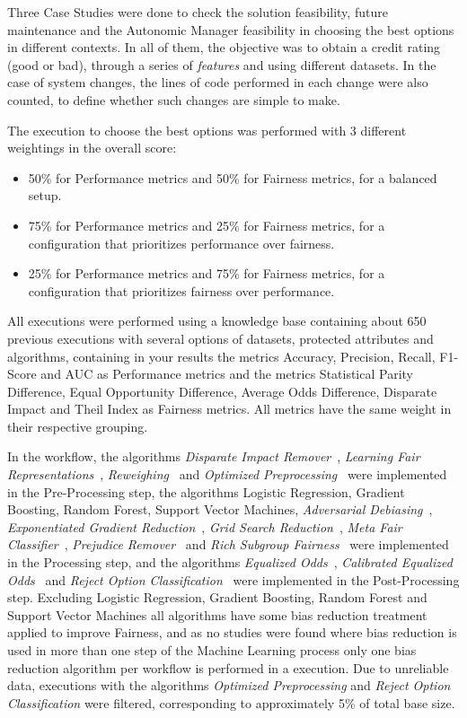 \documentclass[runningheads]{llncs}
\begin{document}
Three Case Studies were done to check the solution feasibility, future maintenance and the Autonomic Manager feasibility in choosing the best options in different contexts. In all of them, the objective was to obtain a credit rating (good or bad), through a series of \textit{features} and using different datasets. In the case of system changes, the lines of code performed in each change were also counted, to define whether such changes are simple to make.

The execution to choose the best options was performed with 3 different weightings in the overall score:

\begin{itemize}
\item 50\% for Performance metrics and 50\% for Fairness metrics, for a balanced setup.
\item 75\% for Performance metrics and 25\% for Fairness metrics, for a configuration that prioritizes performance over fairness.
\item 25\% for Performance metrics and 75\% for Fairness metrics, for a configuration that prioritizes fairness over performance.
\end{itemize}

All executions were performed using a knowledge base containing about 650 previous executions with several options of datasets, protected attributes and algorithms, containing in your results the metrics Accuracy, Precision, Recall, F1-Score and AUC as Performance metrics and the metrics Statistical Parity Difference, Equal Opportunity Difference, Average Odds Difference, Disparate Impact and Theil Index as Fairness metrics. All metrics have the same weight in their respective grouping.

In the workflow, the algorithms \textit{Disparate Impact Remover}~\citep{Feldman_2015}, \textit{Learning Fair Representations}~\citep{Zemel_2013}, \textit{Reweighing}~\citep{Kamiran_2011} and \textit{Optimized Preprocessing}~\citep{Calmon_2017} were implemented in the Pre-Processing step, the algorithms Logistic Regression, Gradient Boosting, Random Forest, Support Vector Machines, \textit{Adversarial Debiasing}~\citep{Zhang_2018}, \textit{Exponentiated Gradient Reduction}~\citep{Agarwal_2018}, \textit{Grid Search Reduction}~\citep{Agarwal_2019}, \textit{Meta Fair Classifier}~\citep{Celis_2019}, \textit{Prejudice Remover}~\citep{Kamishima_2012} and \textit{Rich Subgroup Fairness}~\citep{Kearns_2018} were implemented in the Processing step, and the algorithms \textit{Equalized Odds}~\citep{Hardt_2016}, \textit{Calibrated Equalized Odds}~\citep{Pleiss_2017} and \textit{Reject Option Classification}~\citep{Kamiran_2012} were implemented in the Post-Processing step. Excluding Logistic Regression, Gradient Boosting, Random Forest and Support Vector Machines all algorithms have some bias reduction treatment applied to improve Fairness, and as no studies were found where bias reduction is used in more than one step of the Machine Learning process only one bias reduction algorithm per workflow is performed in a execution. Due to unreliable data, executions with the algorithms \textit{Optimized Preprocessing} and \textit{Reject Option Classification} were filtered, corresponding to approximately 5\% of total base size.
\end{document}
